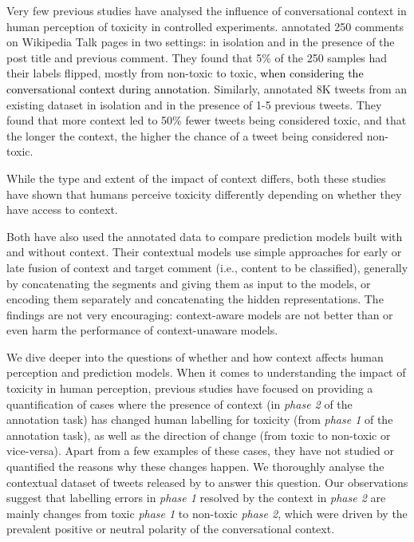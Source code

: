 \documentclass[acmsmall]{acmart}
\newcommand{\red}[1]{\textcolor{black}{#1}}
\begin{document}
Very few previous studies have analysed the influence of conversational context in human perception of toxicity in controlled experiments. \citet{pavlopoulos-etal-2020-toxicity} annotated 250 comments on Wikipedia Talk pages in two settings: in isolation and in the presence of the post title and previous comment. They found that 5\% of the 250 samples had their labels flipped, mostly from non-toxic to toxic\red{, when considering the conversational context during annotation}. Similarly, \citet{FBK} annotated 8K tweets from an existing dataset \cite{Antigoni} in isolation and in the presence of 1-5 previous tweets. They found that more context led to 50\% fewer tweets  being considered toxic, and that the longer the context, the higher the chance of a tweet being considered non-toxic. 

While the type and extent of the impact of context differs, both these studies have shown that humans perceive toxicity differently depending on whether they have access to context. 

Both \cite{pavlopoulos-etal-2020-toxicity,FBK} have also used the annotated data to compare prediction models built with and without context. Their contextual models use simple approaches for early or late fusion of context and target comment (i.e., content to be classified), generally by concatenating the segments and giving them as input to the models, or encoding them separately and concatenating the hidden representations. The findings are not very encouraging:  context-aware models are not better than or even harm the performance of context-unaware models. 

We dive deeper into the questions of whether and how context affects human perception and prediction models. When it comes to understanding the impact of toxicity in human perception,  previous  studies have focused on providing a quantification of cases where the presence of context (in {\em phase 2} of the annotation task) has changed human labelling for toxicity (from {\em phase 1} of the annotation task), as well as the direction of change (from toxic to non-toxic or vice-versa). Apart from a few examples of these cases, they have not studied or quantified the reasons why these changes happen. We thoroughly analyse the contextual dataset of tweets released by \citet{FBK} to answer this question. Our observations suggest that labelling errors in {\em phase 1} resolved by the context in {\em phase 2} are mainly changes from toxic {\em phase 1} to non-toxic {\em phase 2}, which were driven by the prevalent positive or neutral polarity of the conversational context.  
\end{document}
